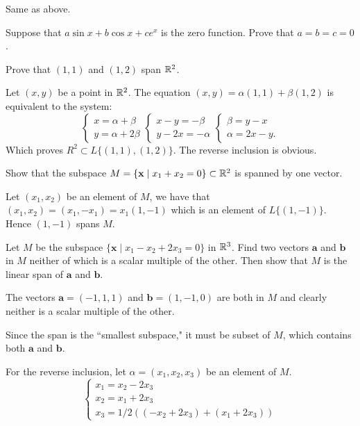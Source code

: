 \documentclass[../../main.tex]{subfiles}
\begin{document}
\begin{solution}
	Same as above.
\end{solution}
\begin{problem}
Suppose that  $a \sin x + b \cos x + c e^x$ is the zero function. Prove that  $a = b = c = 0$.    	
\end{problem}
\begin{problem}
	Prove that  $(1,1)$ and  $(1,2)$  span  $\mathbb{R}^2$.
\end{problem}
\begin{solution}
	Let $(x,y)$ be a point in $\mathbb{R}^2$. The equation $(x,y) = \alpha (1,1) + \beta (1,2)$ is equivalent to the system:
	\[
	\begin{cases}
		x = \alpha + \beta \\
		y = \alpha + 2\beta
	\end{cases}
	\begin{cases}
		x - y = -\beta \\
		y - 2x = -\alpha
	\end{cases}
	\begin{cases}
		\beta = y-x \\
		\alpha = 2x - y.
	\end{cases}
\]
	Which proves $R^2 \subset L\{(1,1), (1,2)\} $. The reverse inclusion is obvious.
\end{solution}
\begin{problem}
	Show that the subspace $M = \{\mathbf{x} \mid x_1 + x_2 = 0 \} \subset \mathbb{R}^2$ is spanned by one vector. 
\end{problem}
\begin{solution}
Let $(x_1, x_2)$ be an element of $M$, we have that $(x_1, x_2) = (x_1, -x_1) = x_1(1, -1)$ which is an element of $L\{(1,-1)\}$. Hence $(1,-1)$ spans $M$.
\end{solution}
\begin{problem}
	Let $M$ be the subspace $\{\mathbf{x} \mid x_1 - x_2 + 2x_3 = 0 \}$ in $\mathbb{R}^3$. Find two vectors $\mathbf{a}$ and $\mathbf{b}$ in $M$ neither of which is a scalar multiple of the other. Then show that $M$ is the linear span of $\mathbf{a}$ and $\mathbf{b}$.
\end{problem}
\begin{solution}
	The vectors $\mathbf{a} = (-1,1,1)$ and $\mathbf{b} = (1,-1,0)$ are both in $M$ and clearly neither is a scalar multiple of the other. \par
	Since the span is the ``smallest subspace," it must be subset of $M$, which contains both $\mathbf{a}$ and $\mathbf{b}$. \par For the reverse inclusion, let $\alpha = (x_1, x_2, x_3)$ be an element of $M$.  
	\[
	\begin{cases}
		x_1 =x_2 -2x_3 \\
		x_2 = x_1 + 2x_3 \\
		x_3 = 1/2 ((-x_2+2x_3) + (x_1 + 2x_3)) 
	\end{cases}
	\]
	
\end{solution}
\end{document}
